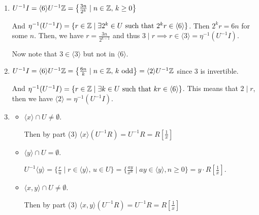\documentclass[Notebook.tex]{subfiles}
\begin{document}
\begin{solution}
\begin{enumerate}
		\item $U^{-1}I = \langle 6 \rangle U^{-1}\mathbb Z = \left\{ \frac{3n}{2^k} \mid n \in \mathbb Z, \, k \geq 0\right\}$
		
		And $\eta^{-1}(U^{-1}I) = \{r \in \mathbb Z \mid \exists 2^k \in U \text{ such that } 2^kr \in \langle 6 \rangle\}$. Then $2^k r = 6n$ for some $n$. Then, we have $r = \frac{3n}{2^{k-1}}$ and thus $3 \mid r \implies r \in \langle 3 \rangle = \eta^{-1}(U^{-1}I)$. 

		Now note that $3 \in \langle 3 \rangle$ but not in $\langle 6 \rangle$. 

		\item $U^{-1}I = \langle 6 \rangle U^{-1}\mathbb Z = \left\{ \frac{6n}{k} \mid n \in \mathbb Z, \, k  \text{ odd}\right\} = \langle 2 \rangle U^{-1}\mathbb Z$ since $3$ is invertible. 
		
		And $\eta^{-1}(U^{-1}I) = \{r \in \mathbb Z \mid \exists k \in U \text{ such that } kr \in \langle 6 \rangle\}$. This means that $2 \mid r$, then we have $\langle 2 \rangle = \eta^{-1}(U^{-1}I)$. 

		\item 
		\begin{itemize}
			\item $\langle x \rangle \cap U \neq \emptyset$. 
			
			Then by part (3) $\langle x \rangle (U^{-1}R) = U^{-1}R = R \left[\frac{1}{x}\right]$

			\item $\langle y \rangle \cap U = \emptyset$. 
			
			$U^{-1}\langle y \rangle = \{\frac{r}{u} \mid r \in \langle y \rangle, \, u \in U\} =\{\frac{ay}{x^n} \mid ay \in \langle y \rangle, n \geq 0 \} = y \cdot R\left[\frac{1}{x}\right]$.

			\item $\langle x, y\rangle \cap U \neq \emptyset$. 
			
			Then by part (3) $\langle x,y \rangle (U^{-1}R) = U^{-1}R = R \left[\frac{1}{x}\right]$
		\end{itemize} 
	\end{enumerate}
\end{solution}

\newpage 
\end{document}
